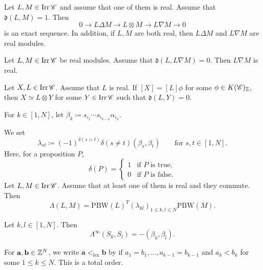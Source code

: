 \begin{Lem}
\label{Lem : d one exact sequence}
Let $L, M \in \mathop{\mathrm{Irr}}\nolimits\mathscr{C}$ and assume that one of them is real.
Assume that $\mathfrak{d}(L, M) = 1$.
Then
\[
0 \longrightarrow L \Delta M
\longrightarrow L \otimes M
\longrightarrow L \nabla M \longrightarrow 0
\]
is an exact sequence. 
In addition, if $L, M$ are both real, then $L \Delta M$ and $L \nabla M$ are real modules.
\end{Lem}

\begin{Lem}
\label{Lem : reality of head commuting with a factor}
Let $L, M \in \mathop{\mathrm{Irr}}\nolimits\mathscr{C}$ be real modules.
Assume that $\mathfrak{d}(L, L \nabla M) = 0$.
Then $L \nabla M$ is real.
\end{Lem}

\begin{Prop}
\label{Prop : divisibility by a real simple module}
Let $X, L \in \mathop{\mathrm{Irr}}\nolimits\mathscr{C}$.
Assume that $L$ is real.
If $[X] = [L]\phi$ for some $\phi \in K(\mathscr{C})_{\mathbb{Z}}$,
then $X \simeq L \otimes Y$ for some $Y \in \mathop{\mathrm{Irr}}\nolimits\mathscr{C}$
such that $\mathfrak{d}(L, Y) = 0$.
\end{Prop}

For $k \in [1, N]$, let $\beta_k \coloneq s_{\iota_1}\cdots s_{\iota_{k - 1}}\alpha_{\iota_k}$. 

\begin{Lem}
\label{Lem : Lambda and PBW}
We set
\[
\lambda_{st} \coloneq (-1)^{\delta(s > t)}\delta(s \neq t)
(\beta_s, \beta_t)
\qquad \text{for }s, t \in [1, N].
\]
Here, for a proposition $P$,
\[
\delta(P) =
\begin{cases}
1 & \text{if }P\text{ is true}, \\
0 & \text{if }P\text{ is false}.
\end{cases}
\]
Let $L, M \in \mathop{\mathrm{Irr}}\nolimits \mathscr{C}$. 
Assume that at least one of them is real and they commute. 
Then
\[
\Lambda(L, M) = \mathrm{PBW}(L)^{T}(\lambda_{kl})_{1 \leq k, l\leq N}\mathrm{PBW}(M). 
\]
\end{Lem}

\begin{Lem}
\label{Lem : Lambda infinity of cuspidal modules}
Let $k, l \in [1, N]$.
Then
\[
\Lambda^{\infty}(S_k, S_l) = -(\beta_k, \beta_l).
\]
\end{Lem}
For $\mathbf{a}, \mathbf{b} \in \mathbb{Z}^N$, we write $\mathbf{a}<_{\mathrm{lex}}\mathbf{b}$ by 
if $a_1=b_1, \ldots, a_{k-1}=b_{k-1}$ and $a_k<b_k$ for some $1 \leq k\leq N$. 
This is a total order. 

